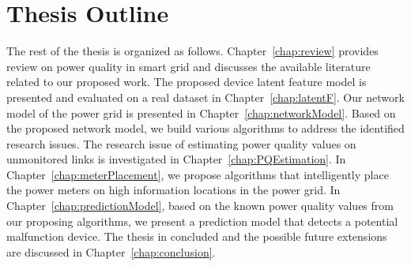 \section{Thesis Outline}
The rest of the thesis is organized as follows. Chapter~\ref{chap:review} provides review on power quality in smart grid and discusses the available literature related to our proposed work. The proposed device latent feature model is presented and evaluated on a real dataset in Chapter~\ref{chap:latentF}. Our network model of the power grid is presented in Chapter~\ref{chap:networkModel}. Based on the proposed network model, we build various algorithms to address the identified research issues. The research issue of estimating power quality values on unmonitored links is investigated in Chapter~\ref{chap:PQEstimation}. In Chapter~\ref{chap:meterPlacement}, we propose algorithms that intelligently place the power meters on high information locations in the power grid. In Chapter~\ref{chap:predictionModel}, based on the known power quality values from our proposing algorithms, we present a prediction model that detects a potential malfunction device. The thesis in concluded and the possible future extensions are discussed in Chapter~\ref{chap:conclusion}.